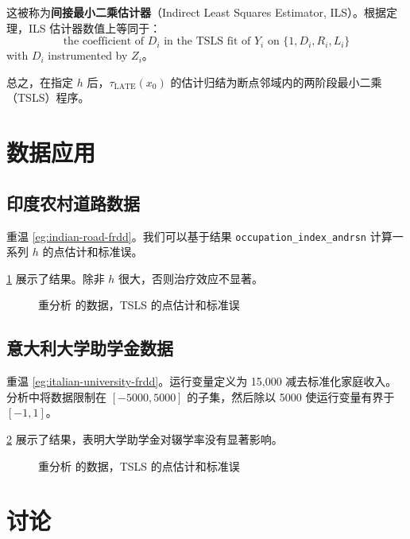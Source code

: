 这被称为\textbf{间接最小二乘估计器}（Indirect Least Squares Estimator, ILS）。根据定理，ILS 估计器数值上等同于：
\[
\text{the coefficient of } D_i \text{ in the TSLS fit of } Y_i \text{ on } \{1, D_i, R_i, L_i\}
\]
with $D_i$ instrumented by $Z_i$。

总之，在指定 $h$ 后，$\tau_{\mathrm{LATE}}(x_0)$ 的估计归结为断点邻域内的两阶段最小二乘（TSLS）程序。

\section{数据应用}

\subsection{印度农村道路数据}\label{sec:indian-road-app-frdd}

重温 \cref{eg:indian-road-frdd}。我们可以基于结果 \texttt{occupation\_index\_andrsn} 计算一系列 $h$ 的点估计和标准误。

\cref{fig:indian_road_frdd} 展示了结果。除非 $h$ 很大，否则治疗效应不显著。

\begin{figure}
\centering
\caption{重分析 \citet{asher2020rural} 的数据，TSLS 的点估计和标准误}\label{fig:indian_road_frdd}
\end{figure}

\subsection{意大利大学助学金数据}\label{sec:italian-university-app-frdd}

重温 \cref{eg:italian-university-frdd}。运行变量定义为 15,000 减去标准化家庭收入。分析中将数据限制在 $[-5000, 5000]$ 的子集，然后除以 5000 使运行变量有界于 $[-1, 1]$。

\cref{fig:italy_university_frdd} 展示了结果，表明大学助学金对辍学率没有显著影响。

\begin{figure}
\centering
\caption{重分析 \citet{li2015evaluating} 的数据，TSLS 的点估计和标准误}\label{fig:italy_university_frdd}
\end{figure}

\section{讨论}

